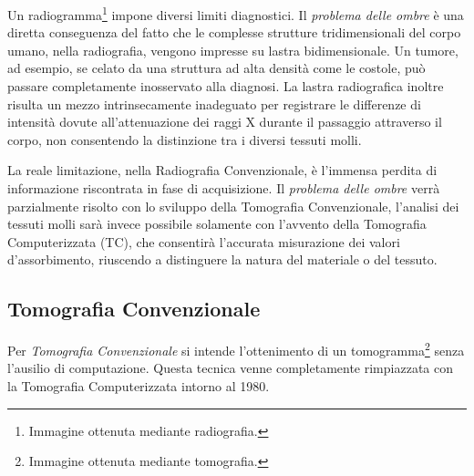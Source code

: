 \documentclass[a4paper,12pt, doubleside]{report}
\begin{document}
                \bigskip 
                \par
                    Un radiogramma\footnote{Immagine ottenuta mediante radiografia.} impone diversi limiti diagnostici. Il \textit{problema delle ombre} è una diretta conseguenza del fatto che le complesse strutture tridimensionali del corpo umano, nella radiografia, vengono impresse su lastra bidimensionale. Un tumore, ad esempio, se celato da una struttura ad alta densità come le costole, può passare completamente inosservato alla diagnosi. La lastra radiografica inoltre risulta un mezzo intrinsecamente inadeguato per registrare le differenze di intensità dovute all'attenuazione dei raggi X durante il passaggio attraverso il corpo, non consentendo la distinzione tra i diversi tessuti molli.
                
                \bigskip            
                \par
                    La reale limitazione, nella Radiografia Convenzionale, è l'immensa perdita di informazione riscontrata in fase di acquisizione. Il \textit{problema delle ombre} verrà parzialmente risolto con lo sviluppo della Tomografia Convenzionale, l'analisi dei tessuti molli sarà invece possibile solamente con l'avvento della Tomografia Computerizzata (TC), che consentirà l'accurata misurazione dei valori d'assorbimento, riuscendo a distinguere la natura del materiale o del tessuto.
                            
            \subsection{Tomografia Convenzionale}
            \label{sec:TomografiaConvenzionale}
                \par
                    Per \textit{Tomografia Convenzionale} si intende l'ottenimento di un tomogramma\footnote{Immagine ottenuta mediante tomografia.} senza l'ausilio di computazione. Questa tecnica venne completamente rimpiazzata con la Tomografia Computerizzata intorno al 1980.
                
\end{document}
